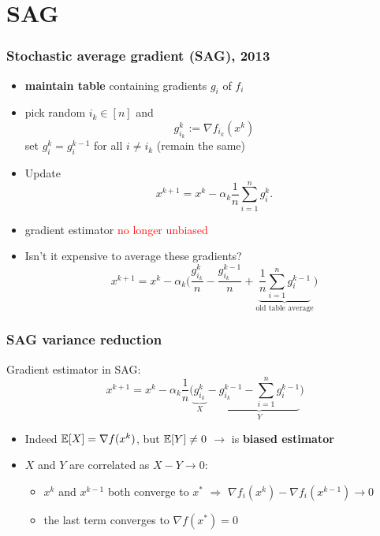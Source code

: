 \documentclass[aspectratio=149]{beamer}
\begin{document}
\section{SAG}%
\label{sec:}

\begin{frame}
  \frametitle{Stochastic average gradient (SAG), 2013}
  \begin{itemize}
    \item \textbf{maintain table} containing gradients $g_i$ of $f_i$
    \item pick random $i_k \in [n]$ and
          \begin{equation}
            g_{i_k}^k := \nabla f_{i_k}(x^{k})
          \end{equation}
          set $g_{i}^k = g_i^{k-1}$ for all $i\neq i_k$ (remain the same)
    \item Update
          \begin{equation}
            x^{k+1} = x^k - \alpha_k \frac{1}{n} \sum_{i=1}^{n} g_i^k.
          \end{equation}
    \item gradient estimator \textcolor{red}{no longer unbiased}
    \item Isn't it expensive to average these gradients?
          \begin{equation}
            x^{k+1} = x^k - \alpha_k  \Big( \frac{g_{i_k}^k}{n} - \frac{g_{i_k}^{k-1}}{n} + \underbrace{\frac{1}{n}\sum_{i=1}^{n} g_i^{k-1}}_{\text{old table average}} \Big)
          \end{equation}
  \end{itemize}
\end{frame}


\begin{frame}
  \frametitle{SAG variance reduction}
  Gradient estimator in SAG:
  \begin{equation}
    x^{k+1} = x^k - \alpha_k \frac{1}{n} \Big( \underbrace{g_{i_k}^k}_X - \underbrace{g_{i_k}^{k-1} - \sum_{i=1}^{n} g_i^{k-1}}_{Y} \Big)
  \end{equation}
  \begin{itemize}
    \item Indeed $\mathbb{E}[X] = \nabla f(x^k)$, but $\mathbb{E}[Y]\neq 0$ $\rightarrow $ is \textbf{biased estimator}
    \item $X$ and $Y$ are correlated as $X-Y \to 0$:
          \begin{itemize}
            \item $x^k$ and $x^{k-1}$ both converge to $x^*$ $\Rightarrow$ $ \nabla f_i(x^k) - \nabla f_i(x^{k-1}) \to 0$
            \item the last term converges to $\nabla f(x^*)= 0$
          \end{itemize}
  \end{itemize}
\end{frame}
\end{document}
